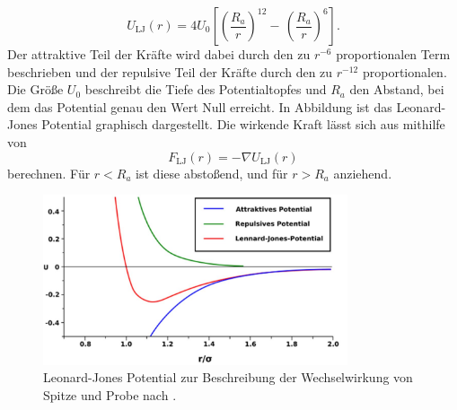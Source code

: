 \begin{equation}
  U_{\text{LJ}}(r) = 4U_0\left[\left(\frac{R_a}{r}\right)^{12}-\,\left(\frac{R_a}{r}\right)^6\right].
\end{equation}
Der attraktive Teil der Kräfte wird dabei durch den zu $r^{-6}$ proportionalen Term beschrieben und der repulsive Teil der Kräfte durch den zu $r^{-12}$ proportionalen.
Die Größe $U_0$ beschreibt die Tiefe des Potentialtopfes und $R_a$ den Abstand, bei dem das Potential genau den Wert Null erreicht. In Abbildung \label{fig:LJ} ist das Leonard-Jones Potential graphisch dargestellt.
Die wirkende Kraft lässt sich aus mithilfe von
\begin{equation}
  F_{\text{LJ}}(r) = - \nabla U_{\text{LJ}}(r)
\end{equation}
berechnen. Für $r<R_a$ ist diese abstoßend, und für $r>R_a$ anziehend.
\begin{figure}[H]
  \centering
  \includegraphics[width=0.8\textwidth]{content/LJ.jpg}
  \caption{Leonard-Jones Potential zur Beschreibung der Wechselwirkung von Spitze und Probe nach \cite{Voigt}.}
  \label{fig:LJ}
\end{figure}
